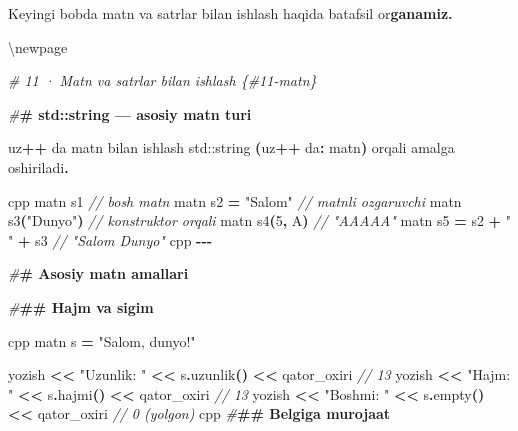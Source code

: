 \documentclass[a4paper,11pt,twoside,openright]{book}
\newenvironment{Shaded}{\begin{snugshade}}{\end{snugshade}}
\newcommand{\BuiltInTok}[1]{#1}
\newcommand{\CharTok}[1]{\textcolor[rgb]{0.31,0.60,0.02}{#1}}
\newcommand{\CommentTok}[1]{\textcolor[rgb]{0.56,0.35,0.01}{\textit{#1}}}
\newcommand{\DecValTok}[1]{\textcolor[rgb]{0.00,0.00,0.81}{#1}}
\newcommand{\ErrorTok}[1]{\textcolor[rgb]{0.64,0.00,0.00}{\textbf{#1}}}
\newcommand{\NormalTok}[1]{#1}
\newcommand{\OperatorTok}[1]{\textcolor[rgb]{0.81,0.36,0.00}{\textbf{#1}}}
\newcommand{\PreprocessorTok}[1]{\textcolor[rgb]{0.56,0.35,0.01}{\textit{#1}}}
\newcommand{\StringTok}[1]{\textcolor[rgb]{0.31,0.60,0.02}{#1}}
\begin{document}
\begin{Shaded}
\begin{Highlighting}[]
\NormalTok{Keyingi bobda matn va satrlar bilan ishlash haqida batafsil o}\CharTok{\textquotesingle{}r}\ErrorTok{ganamiz.}


\NormalTok{\textbackslash{}newpage}

\PreprocessorTok{\# 11 · Matn va satrlar bilan ishlash \{\#11{-}matn\}}

\PreprocessorTok{\#}\ErrorTok{\# \textasciigrave{}std::string\textasciigrave{} — asosiy matn turi}

\NormalTok{uz}\OperatorTok{++}\NormalTok{ da matn bilan ishlash }\ErrorTok{\textasciigrave{}}\BuiltInTok{std::}\NormalTok{string}\ErrorTok{\textasciigrave{}} \OperatorTok{(}\NormalTok{uz}\OperatorTok{++}\NormalTok{ da}\OperatorTok{:} \ErrorTok{\textasciigrave{}}\NormalTok{matn}\ErrorTok{\textasciigrave{}}\OperatorTok{)}\NormalTok{ orqali amalga oshiriladi}\OperatorTok{.}

\ErrorTok{\textasciigrave{}\textasciigrave{}\textasciigrave{}}\NormalTok{cpp}
\NormalTok{matn s1                        }\CommentTok{// bo\textquotesingle{}sh matn}
\NormalTok{matn s2 }\OperatorTok{=} \StringTok{"Salom"}              \CommentTok{// matnli o\textquotesingle{}zgaruvchi}
\NormalTok{matn s3}\OperatorTok{(}\StringTok{"Dunyo"}\OperatorTok{)}               \CommentTok{// konstruktor orqali}
\NormalTok{matn s4}\OperatorTok{(}\DecValTok{5}\OperatorTok{,} \CharTok{\textquotesingle{}A\textquotesingle{}}\OperatorTok{)}                \CommentTok{// "AAAAA"}
\NormalTok{matn s5 }\OperatorTok{=}\NormalTok{ s2 }\OperatorTok{+} \StringTok{" "} \OperatorTok{+}\NormalTok{ s3        }\CommentTok{// "Salom Dunyo"}
\ErrorTok{\textasciigrave{}\textasciigrave{}\textasciigrave{}}\NormalTok{cpp}
\OperatorTok{{-}{-}{-}}

\PreprocessorTok{\#}\ErrorTok{\# Asosiy matn amallari}

\PreprocessorTok{\#}\ErrorTok{\#\# Hajm va sig\textquotesingle{}im}

\ErrorTok{\textasciigrave{}\textasciigrave{}\textasciigrave{}}\NormalTok{cpp}
\NormalTok{matn s }\OperatorTok{=} \StringTok{"Salom, dunyo!"}

\NormalTok{yozish }\OperatorTok{\textless{}\textless{}} \StringTok{"Uzunlik: "} \OperatorTok{\textless{}\textless{}}\NormalTok{ s}\OperatorTok{.}\NormalTok{uzunlik}\OperatorTok{()} \OperatorTok{\textless{}\textless{}}\NormalTok{ qator\_oxiri      }\CommentTok{// 13}
\NormalTok{yozish }\OperatorTok{\textless{}\textless{}} \StringTok{"Hajm: "} \OperatorTok{\textless{}\textless{}}\NormalTok{ s}\OperatorTok{.}\NormalTok{hajmi}\OperatorTok{()} \OperatorTok{\textless{}\textless{}}\NormalTok{ qator\_oxiri           }\CommentTok{// 13}
\NormalTok{yozish }\OperatorTok{\textless{}\textless{}} \StringTok{"Bo\textquotesingle{}shmi: "} \OperatorTok{\textless{}\textless{}}\NormalTok{ s}\OperatorTok{.}\NormalTok{empty}\OperatorTok{()} \OperatorTok{\textless{}\textless{}}\NormalTok{ qator\_oxiri        }\CommentTok{// 0 (yolg\textquotesingle{}on)}
\ErrorTok{\textasciigrave{}\textasciigrave{}\textasciigrave{}}\NormalTok{cpp}
\PreprocessorTok{\#}\ErrorTok{\#\# Belgiga murojaat}


\end{Highlighting}
\end{Shaded}
\end{document}
